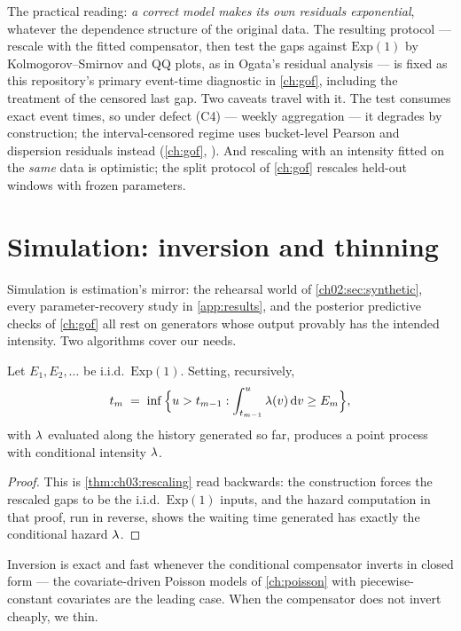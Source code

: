 The practical reading: \emph{a correct model makes its own residuals
exponential}, whatever the dependence structure of the original data. The
resulting protocol --- rescale with the fitted compensator, then test the
gaps against $\mathrm{Exp}(1)$ by Kolmogorov--Smirnov and QQ plots, as in
Ogata's residual analysis \citep{ogata1988} --- is fixed as this
repository's primary event-time diagnostic in \cref{ch:gof}, including
the treatment of the censored last gap. Two caveats travel with it. The
test consumes exact event times, so under defect (C4) --- weekly
aggregation --- it degrades by construction; the interval-censored regime
uses bucket-level Pearson and dispersion residuals instead
(\cref{ch:gof}, ). And rescaling with an intensity
fitted on the \emph{same} data is optimistic; the split protocol of
\cref{ch:gof} rescales held-out windows with frozen parameters.

\section{Simulation: inversion and thinning}\label{ch03:sec:simulation}

Simulation is estimation's mirror: the rehearsal world of
\cref{ch02:sec:synthetic}, every parameter-recovery study in
\cref{app:results}, and the posterior predictive checks of
\cref{ch:gof} all rest on generators whose output provably has the
intended intensity. Two algorithms cover our needs.

\begin{corollary}\label{cor:ch03:inversion}
Let $E_1, E_2, \dots$ be i.i.d.\ $\mathrm{Exp}(1)$. Setting, recursively,
\[
t_m \;=\; \inf\Big\{u > t_{m-1} : \int_{t_{m-1}}^{u} \lambda(v)\,\mathrm{d} v \ge E_m\Big\},
\]
with $\lambda$ evaluated along the history generated so far, produces a point
process with conditional intensity $\lambda$.
\end{corollary}

\begin{proof}
This is \cref{thm:ch03:rescaling} read backwards: the construction forces
the rescaled gaps to be the i.i.d.\ $\mathrm{Exp}(1)$ inputs, and the
hazard computation in that proof, run in reverse, shows the waiting time
generated has exactly the conditional hazard $\lambda$.
\end{proof}

Inversion is exact and fast whenever the conditional compensator inverts
in closed form --- the covariate-driven Poisson models of
\cref{ch:poisson} with piecewise-constant covariates are the leading case.
When the compensator does not invert cheaply, we thin.

